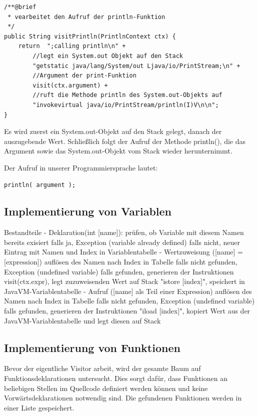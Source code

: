 \documentclass[12pt, a4paper, oneside, ngerman]{article}
\begin{document}
\begin{lstlisting}[frame=single]
/**@brief
 * vearbeitet den Aufruf der println-Funktion
 */
public String visitPrintln(PrintlnContext ctx) {
	return  ";calling println\n" + 
		//legt ein System.out Objekt auf den Stack
		"getstatic java/lang/System/out Ljava/io/PrintStream;\n" + 	
		//Argument der print-Funktion
		visit(ctx.argument) + 						
		//ruft die Methode println des System.out-Objekts auf
		"invokevirtual java/io/PrintStream/println(I)V\n\n"; 				
}
\end{lstlisting}

Es wird zuerst ein System.out-Objekt auf den Stack gelegt, danach der auszugebende Wert. Schließlich folgt der Aufruf der Methode println(), die das Argument sowie das System.out-Objekt vom Stack wieder herunternimmt.


Der Aufruf in unserer Programmiersprache lautet: 
\begin{lstlisting}[frame=single]
println( argument );
\end{lstlisting}

\subsection{Implementierung von Variablen}
Bestandteile
	-	Deklaration(int [name]):
			prüfen, ob Variable mit diesem Namen bereits exisiert
				falls ja, Exception (variable already defined)
				falls nicht, neuer Eintrag mit Namen und Index in Variablentabelle
	-	Wertzuweisung ([name] = [expression])
			auflösen des Namen nach Index in Tabelle
				falls nicht gefunden, Exception (undefined variable)
				falls gefunden, generieren der Instruktionen
					visit(ctx.expr), legt zuzuweisenden Wert auf Stack
					"istore [index]", speichert in JavaVM-Variablentabelle
	-	Aufruf ([name] als Teil einer Expression)
			auflösen des Namen nach Index in Tabelle
				falls nicht gefunden, Exception (undefined variable)
				falls gefunden, generieren der Instruktionen
					"iload [index]", kopiert Wert aus der JavaVM-Variablentabelle und legt diesen auf Stack


\subsection{Implementierung von Funktionen}
Bevor der eigentliche Visitor arbeit, wird der gesamte Baum auf Funktionsdeklarationen untersucht. Dies sorgt dafür, dass Funktionen an beliebigen Stellen im Quellcode definiert werden können und keine Vorwärtsdeklarationen notwendig sind. Die gefundenen Funktionen werden in einer Liste gespeichert.
\end{document}
